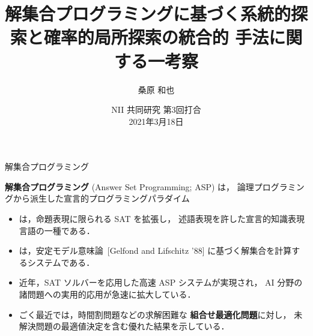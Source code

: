 \documentclass[11pt,dvipdfmx]{beamer}
\title{解集合プログラミングに基づく系統的探索と確率的局所探索の統合的
  手法に関する一考察}
\author{桑原 和也}
\date{NII 共同研究 第3回打合\\2021年3月18日}
\institute{番原研究室}
\begin{document}
\maketitle
\begin{frame}{解集合プログラミング}
  \begin{alertblock}{}\centering
    \alert{\bf 解集合プログラミング} (Answer Set Programming; ASP) は，
    論理プログラミングから派生した宣言的プログラミングパラダイム
  \end{alertblock}
  \bigskip
  \begin{itemize}
  \item {}は，命題表現に限られる SAT を拡張し，
    述語表現を許した宣言的知識表現言語の一種である．
  \item {}は，安定モデル意味論~[Gelfond and Lifschitz '88]
    に基づく解集合を計算するシステムである．
  \item 近年，SAT ソルバーを応用した高速 ASP システムが実現され，
    AI 分野の諸問題への実用的応用が急速に拡大している．
  \item ごく最近では，時間割問題などの求解困難な
    \alert{\bf 組合せ最適化問題}に対し，
    未解決問題の最適値決定を含む優れた結果を示している．
  \end{itemize}
\end{frame}
\end{document}
